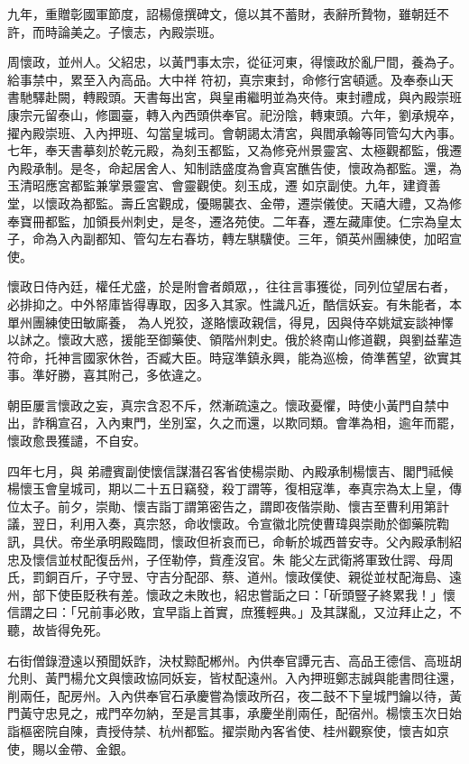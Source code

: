 \begin{pinyinscope}
 九年，重贈彰國軍節度，詔楊億撰碑文，億以其不蓄財，表辭所贄物，雖朝廷不許，而時論美之。子懷志，內殿崇班。



 周懷政，並州人。父紹忠，以黃門事太宗，從征河東，得懷政於亂尸間，養為子。給事禁中，累至入內高品。大中祥
 符初，真宗東封，命修行宮頓遞。及奉泰山天書馳驛赴闕，轉殿頭。天書每出宮，與皇甫繼明並為夾侍。東封禮成，與內殿崇班康宗元留泰山，修圜臺，轉入內西頭供奉官。祀汾陰，轉東頭。六年，劉承規卒，擢內殿崇班、入內押班、勾當皇城司。會朝謁太清宮，與閻承翰等同管勾大內事。七年，奉天書摹刻於乾元殿，為刻玉都監，又為修兗州景靈宮、太極觀都監，俄遷內殿承制。是冬，命起居舍人、知制誥盛度為會真宮醮告使，懷政為都監。還，為玉清昭應宮都監兼掌景靈宮、會靈觀使。刻玉成，遷
 如京副使。九年，建資善堂，以懷政為都監。壽丘宮觀成，優賜襲衣、金帶，遷崇儀使。天禧大禮，又為修奉寶冊都監，加領長州刺史，是冬，遷洛苑使。二年春，遷左藏庫使。仁宗為皇太子，命為入內副都知、管勾左右春坊，轉左騏驥使。三年，領英州團練使，加昭宣使。



 懷政日侍內廷，權任尤盛，於是附會者頗眾，，往往言事獲從，同列位望居右者，必排抑之。中外帑庫皆得專取，因多入其家。性識凡近，酷信妖妄。有朱能者，本單州團練使田敏廝養，
 為人兇狡，遂賂懷政親信，得見，因與侍卒姚斌妄談神懌以訹之。懷政大惑，援能至御藥使、領階州刺史。俄於終南山修道觀，與劉益輩造符命，托神言國家休咎，否臧大臣。時寇準鎮永興，能為巡檢，倚準舊望，欲實其事。準好勝，喜其附己，多依違之。



 朝臣屢言懷政之妄，真宗含忍不斥，然漸疏遠之。懷政憂懼，時使小黃門自禁中出，詐稱宣召，入內東門，坐別室，久之而還，以欺同類。會準為相，逾年而罷，懷政愈畏獲譴，不自安。



 四年七月，與
 弟禮賓副使懷信謀潛召客省使楊崇勛、內殿承制楊懷吉、閣門祗候楊懷玉會皇城司，期以二十五日竊發，殺丁謂等，復相寇準，奉真宗為太上皇，傳位太子。前夕，崇勛、懷吉詣丁謂第密告之，謂即夜偕崇勛、懷吉至曹利用第計議，翌日，利用入奏，真宗怒，命收懷政。令宣徽北院使曹瑋與崇勛於御藥院鞫訊，具伏。帝坐承明殿臨問，懷政但祈哀而已，命斬於城西普安寺。父內殿承制紹忠及懷信並杖配復岳州，子侄勒停，貲產沒官。朱
 能父左武衛將軍致仕諤、母周氏，罰銅百斤，子守昱、守吉分配邵、蔡、道州。懷政僕使、親從並杖配海島、遠州，部下使臣貶秩有差。懷政之未敗也，紹忠嘗詬之曰：「斫頭豎子終累我！」懷信謂之曰：「兄前事必敗，宜早詣上首實，庶獲輕典。」及其謀亂，又泣拜止之，不聽，故皆得免死。



 右街僧錄澄遠以預聞妖詐，決杖黥配郴州。內供奉官譚元吉、高品王德信、高班胡允則、黃門楊允文與懷政協同妖妄，皆杖配遠州。入內押班鄭志誠與能書問往還，
 削兩任，配房州。入內供奉官石承慶嘗為懷政所召，夜二鼓不下皇城門鑰以待，黃門黃守忠見之，戒門卒勿納，至是言其事，承慶坐削兩任，配宿州。楊懷玉次日始詣樞密院自陳，責授侍禁、杭州都監。擢崇勛內客省使、桂州觀察使，懷吉如京使，賜以金帶、金銀。




\end{pinyinscope}
